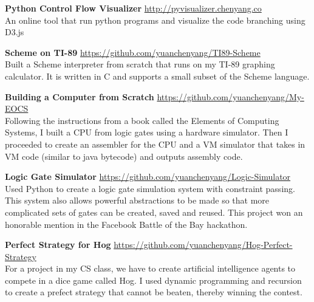 \documentclass[9pt]{article}
\newenvironment{changemargin}[2]{%
  \begin{list}{}{%
      \setlength{\topsep}{0pt}%
      \setlength{\leftmargin}{#1}%
      \setlength{\rightmargin}{#2}%
      \setlength{\listparindent}{\parindent}%
      \setlength{\itemindent}{\parindent}%
      \setlength{\parsep}{\parskip}%
    }%
  \item[]}{\end{list}
}
\newenvironment{body} {
  \vspace*{-16pt}
  \begin{changemargin}{-0.25in}{-0.5in}
  }
  {\end{changemargin}
}
\begin{document}
\begin{body}
  \textbf{Python Control Flow Visualizer} \hfill \url{http://pyvisualizer.chenyang.co}\\
  An online tool that run python programs and visualize the code branching using D3.js\\
  \medskip

  \textbf{Scheme on TI-89} \hfill \url{https://github.com/yuanchenyang/TI89-Scheme}\\
  Built a Scheme interpreter from scratch that runs on my TI-89 graphing calculator. It is written in C and supports a small subset of the Scheme language.\\
  \medskip

  \textbf{Building a Computer from Scratch} \hfill \url{https://github.com/yuanchenyang/My-EOCS}\\
  Following the instructions from a book called the Elements of Computing Systems, I built a CPU from logic gates using a hardware simulator. Then I proceeded to create an assembler for the CPU and a VM simulator that takes in VM code (similar to java bytecode) and outputs assembly code. \\
  \medskip

 \textbf{Logic Gate Simulator} \hfill \url{https://github.com/yuanchenyang/Logic-Simulator}\\
 Used Python to create a logic gate simulation system with constraint passing. This system also allows powerful abstractions to be made so that more complicated sets of gates can be created, saved and reused. This project won an honorable mention in the Facebook Battle of the Bay hackathon.\\
   \medskip

   \textbf{Perfect Strategy for Hog} \hfill \url{https://github.com/yuanchenyang/Hog-Perfect-Strategy}\\
   For a project in my CS class, we have to create artificial intelligence agents to compete in a dice game called Hog. I used dynamic programming and recursion to create a prefect strategy that cannot be beaten, thereby winning the contest. \\
   \medskip
\end{body}

\smallskip

\end{document}
